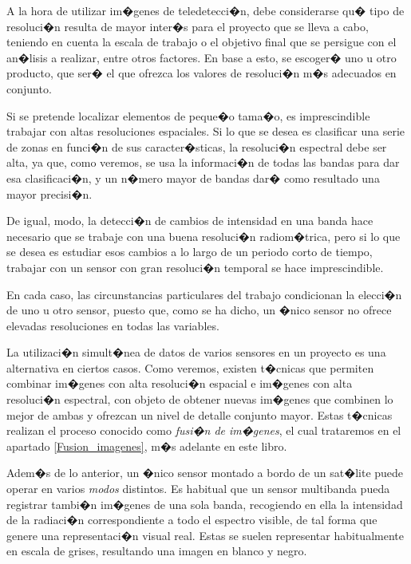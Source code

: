 A la hora de utilizar im�genes de teledetecci�n, debe considerarse qu� tipo de resoluci�n  resulta de mayor inter�s para el proyecto que se lleva a cabo, teniendo en cuenta la escala de trabajo o el objetivo final que se persigue con el an�lisis a realizar, entre otros factores. En base a esto, se escoger� uno u otro producto, que ser� el que ofrezca los valores de resoluci�n m�s adecuados en conjunto.

Si se pretende localizar elementos de peque�o tama�o, es imprescindible trabajar con altas resoluciones espaciales. Si lo que se desea es clasificar una serie de zonas en funci�n de sus caracter�sticas, la resoluci�n espectral debe ser alta, ya que, como veremos, se usa la informaci�n de todas las bandas para dar esa clasificaci�n, y un n�mero mayor de bandas dar� como resultado una mayor precisi�n.

De igual, modo, la detecci�n de cambios de intensidad en una banda hace necesario que se trabaje con una buena resoluci�n radiom�trica, pero si lo que se desea es estudiar esos cambios a lo largo de un periodo corto de tiempo, trabajar con un sensor con gran resoluci�n temporal se hace imprescindible.

En cada caso, las circunstancias particulares del trabajo condicionan la elecci�n de uno u otro sensor, puesto que, como se ha dicho, un �nico sensor no ofrece elevadas resoluciones en todas las variables.

La utilizaci�n simult�nea de datos de varios sensores en un proyecto es una alternativa en ciertos casos. Como veremos, existen t�cnicas que permiten combinar im�genes con alta resoluci�n espacial e im�genes con alta resoluci�n espectral, con objeto de obtener nuevas im�genes que combinen lo mejor de ambas y ofrezcan un nivel de detalle conjunto mayor. Estas t�cnicas realizan el proceso conocido como \emph{fusi�n de im�genes}, el cual trataremos en el apartado  \ref{Fusion_imagenes}, m�s adelante en este libro. 

Adem�s de lo anterior, un �nico sensor montado a bordo de un sat�lite puede operar en varios \emph{modos} distintos. Es habitual que un sensor multibanda pueda registrar tambi�n im�genes de una sola banda, recogiendo en ella la intensidad de la radiaci�n correspondiente a todo el espectro visible, de tal forma que genere una representaci�n visual real. Estas se suelen representar habitualmente en escala de grises, resultando una imagen en blanco y negro.

